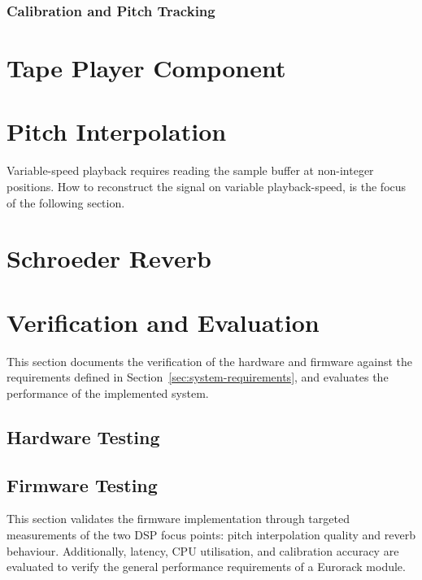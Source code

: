 \documentclass{article}
\begin{document}
		\subsubsection{Calibration and Pitch Tracking}
		
		
\section{Tape Player Component}


%


\newpage
\section{Pitch Interpolation}
\label{sec:focus-1-pitch-interpolation}
Variable-speed playback requires reading the sample buffer at non-integer positions. 
How to reconstruct the signal on variable playback-speed, is the focus of the following section.


\newpage
\section{Schroeder Reverb}
\label{sec:schroeder-reverb}


\newpage
\section{Verification and Evaluation}
This section documents the verification of the hardware and firmware against the requirements defined in Section~\ref{sec:system-requirements}, and evaluates the performance of the implemented system.
\subsection{Hardware Testing}


\newpage
\subsection{Firmware Testing}
This section validates the firmware implementation through targeted measurements of the two DSP focus points: pitch interpolation quality and reverb behaviour.
Additionally, latency, CPU utilisation, and calibration accuracy are evaluated to verify the general performance requirements of a Eurorack module.

\end{document}
